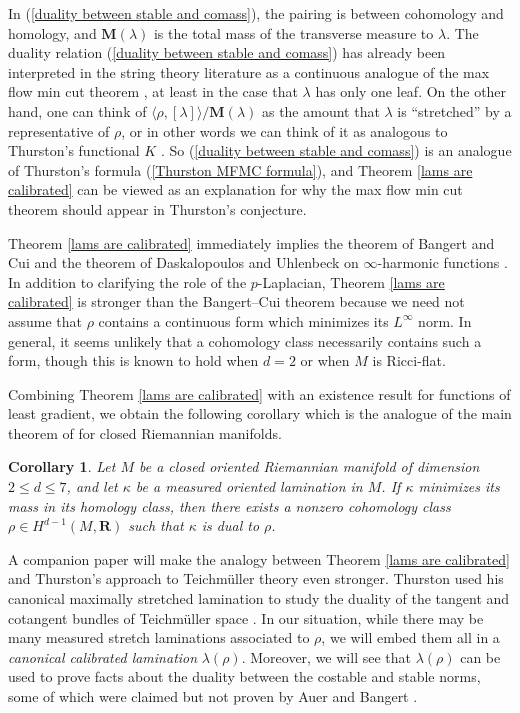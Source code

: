 \documentclass[reqno,11pt]{amsart}
\newcommand{\RR}{\mathbf{R}}
\newcommand{\Mass}{\mathbf M}
\newcommand{\dfn}[1]{\emph{#1}\index{#1}}
\newtheorem{corollary}[theorem]{Corollary}
\theoremstyle{definition}
\numberwithin{equation}{section}
\begin{document}
In (\ref{duality between stable and comass}), the pairing is between cohomology and homology, and $\Mass(\lambda)$ is the total mass of the transverse measure to $\lambda$.
The duality relation (\ref{duality between stable and comass}) has already been interpreted in the string theory literature as a continuous analogue of the max flow min cut theorem \cite{Freedman_2016}, at least in the case that $\lambda$ has only one leaf.
On the other hand, one can think of $\langle \rho, [\lambda]\rangle/\Mass(\lambda)$ as the amount that $\lambda$ is ``stretched'' by a representative of $\rho$, or in other words we can think of it as analogous to Thurston's functional $K$ \cite[\S5.3]{daskalopoulos2020transverse}.
So (\ref{duality between stable and comass}) is an analogue of Thurston's formula (\ref{Thurston MFMC formula}), and Theorem \ref{lams are calibrated} can be viewed as an explanation for why the max flow min cut theorem should appear in Thurston's conjecture.

Theorem \ref{lams are calibrated} immediately implies the theorem of Bangert and Cui \cite{bangert_cui_2017} and the theorem of Daskalopoulos and Uhlenbeck on $\infty$-harmonic functions \cite{daskalopoulos2020transverse}.
In addition to clarifying the role of the $p$-Laplacian, Theorem \ref{lams are calibrated} is stronger than the Bangert--Cui theorem because we need not assume that $\rho$ contains a continuous form which minimizes its $L^\infty$ norm.
In general, it seems unlikely that a cohomology class necessarily contains such a form, though this is known to hold when $d = 2$ \cite{Evans08} or when $M$ is Ricci-flat. 

Combining Theorem \ref{lams are calibrated} with an existence result for functions of least gradient, we obtain the following corollary which is the analogue of the main theorem of \cite{Mazon14} for closed Riemannian manifolds.

\begin{corollary}\label{every minimizer is dual}
Let $M$ be a closed oriented Riemannian manifold of dimension $2 \leq d \leq 7$, and let $\kappa$ be a measured oriented lamination in $M$.
If $\kappa$ minimizes its mass in its homology class, then there exists a nonzero cohomology class $\rho \in H^{d - 1}(M, \RR)$ such that $\kappa$ is dual to $\rho$.
\end{corollary}

A companion paper \cite{BackusBest2} will make the analogy between Theorem \ref{lams are calibrated} and Thurston's approach to Teichm\"uller theory even stronger.
Thurston used his canonical maximally stretched lamination to study the duality of the tangent and cotangent bundles of Teichm\"uller space \cite[\S10]{Thurston98}.
In our situation, while there may be many measured stretch laminations associated to $\rho$, we will embed them all in a \dfn{canonical calibrated lamination} $\lambda(\rho)$.
Moreover, we will see that $\lambda(\rho)$ can be used to prove facts about the duality between the costable and stable norms, some of which were claimed but not proven by Auer and Bangert \cite{Auer01}.
\end{document}
